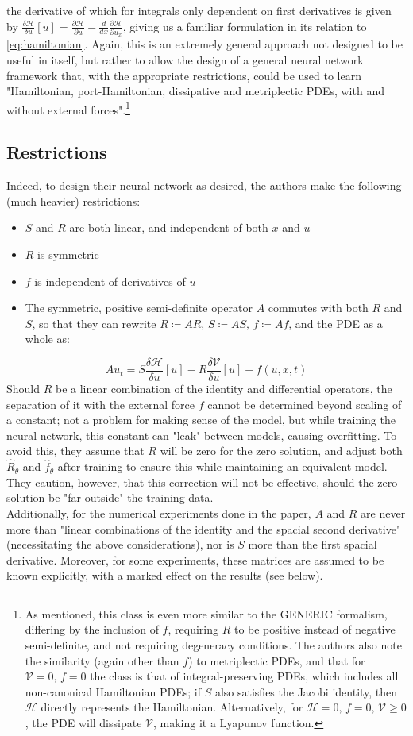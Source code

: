 \documentclass[10 pt, a4paper]{article}
\begin{document}
the derivative of which for integrals only dependent on first derivatives is given by \(\frac{\delta\mathcal{H}}{\delta u}[u] = \frac{\partial\mathcal{H}}{\partial u} - \frac{d}{dx}\frac{\partial\mathcal{H}}{\partial u_x}\), giving us a familiar formulation in its relation to \eqref{eq:hamiltonian}. Again, this is an extremely general approach not designed to be useful in itself, but rather to allow the design of a general neural network framework that, with the appropriate restrictions, could be used to learn "Hamiltonian, port-Hamiltonian, dissipative and metriplectic PDEs, with and without external forces".\footnote{As mentioned, this class is even more similar to the GENERIC formalism, differing by the inclusion of $f$, requiring $R$ to be positive instead of negative semi-definite, and not requiring degeneracy conditions. The authors also note the similarity (again other than $f$) to metriplectic PDEs, and that for $\mathcal{V}=0,\, f=0$ the class is that of integral-preserving PDEs, which includes all non-canonical Hamiltonian PDEs; if $S$ also satisfies the Jacobi identity, then $\mathcal{H}$ directly represents the Hamiltonian. Alternatively, for $\mathcal{H}=0,\,f=0,\,\mathcal{V}\geq 0$, the PDE will dissipate $\mathcal{V}$, making it a Lyapunov function.}
\subsection{Restrictions}
Indeed, to design their neural network as desired, the authors make the following (much heavier) restrictions:
\begin{itemize}
	\item $S$ and $R$ are both linear, and independent of both $x$ and $u$
	\item $R$ is symmetric
	\item $f$ is independent of derivatives of $u$
	\item The symmetric, positive semi-definite operator $A$ commutes with both $R$ and $S$, so that they can rewrite $R\coloneqq AR,\, S\coloneqq AS,\, f\coloneqq Af$, and the PDE as a whole as:
\end{itemize}
\[Au_t = S\frac{\delta\mathcal{H}}{\delta u}[u] - R \frac{\delta\mathcal{V}}{\delta u}[u] + f(u,x,t)\]
Should $R$ be a linear combination of the identity and differential operators, the separation of it with the external force $f$ cannot be determined beyond scaling of a constant; not a problem for making sense of the model, but while training the neural network, this constant can "leak" between models, causing overfitting. To avoid this, they assume that $R$ will be zero for the zero solution, and adjust both $\hat{R}_\theta$ and $\hat{f}_\theta$ after training to ensure this while maintaining an equivalent model. They caution, however, that this correction will not be effective, should the zero solution be "far outside" the training data.\\
Additionally, for the numerical experiments done in the paper, $A$ and $R$ are never more than "linear combinations of the identity and the spacial second derivative" (necessitating the above considerations), nor is $S$ more than the first spacial derivative. Moreover, for some experiments, these matrices are assumed to be known explicitly, with a marked effect on the results (see below).
\end{document}
